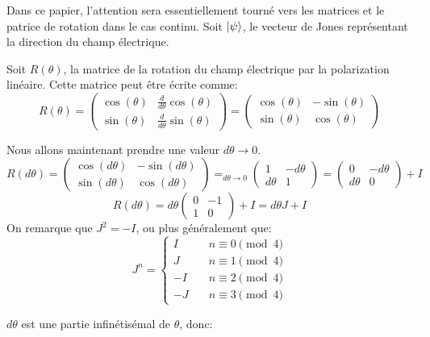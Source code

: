 \documentclass{article}
\begin{document}
\DeclarePairedDelimiter\bra{\langle}{\rvert}
\DeclarePairedDelimiter\ket{\lvert}{\rangle}
\DeclarePairedDelimiterX{}

Dans ce papier, l'attention sera essentiellement tourné vers les matrices et le patrice de rotation dans le cas continu.
Soit \( \ket{\psi} \), le vecteur de Jones représentant la direction du champ électrique.

Soit \( R(\theta) \), la matrice de la rotation du champ électrique par la polarization linéaire.
Cette matrice peut être écrite comme:
$$
R(\theta) = 
\begin{pmatrix}
	\cos(\theta) & \frac{d}{d\theta}\cos(\theta) \\
	\sin(\theta) & \frac{d}{d\theta}\sin(\theta)
\end{pmatrix}
=
\begin{pmatrix}
	\cos(\theta) & -\sin(\theta) \\
	\sin(\theta) & \cos(\theta)
\end{pmatrix}
$$

Nous allons maintenant prendre une valeur \( d\theta \to 0 \).
$$
R(d\theta) = 
\begin{pmatrix}
	\cos(d\theta) & -\sin(d\theta) \\
	\sin(d\theta) & \cos(d\theta)
\end{pmatrix}
=_{d\theta \to 0}
\begin{pmatrix}
	1 & -d\theta \\
	d\theta & 1
\end{pmatrix}
=
\begin{pmatrix}
	0 & -d\theta \\
	d\theta & 0
\end{pmatrix}
+ I
$$
$$
R(d\theta) = d\theta
\begin{pmatrix}
	0 & -1 \\
	1 & 0
\end{pmatrix}
+ I
= d\theta J + I
$$
On remarque que \( J^2 = -I \), ou plus généralement que:
$$
J^n =
\left\{
\begin{array}{ll}
	I & \quad n \equiv 0 \pmod{4} \\
	J & \quad n \equiv 1 \pmod{4} \\
	-I & \quad n \equiv 2 \pmod{4} \\
	-J & \quad n \equiv 3 \pmod{4}
\end{array}
\right.
$$

\( d\theta \) est une partie infinétisémal de \( \theta \), donc:
\end{document}
